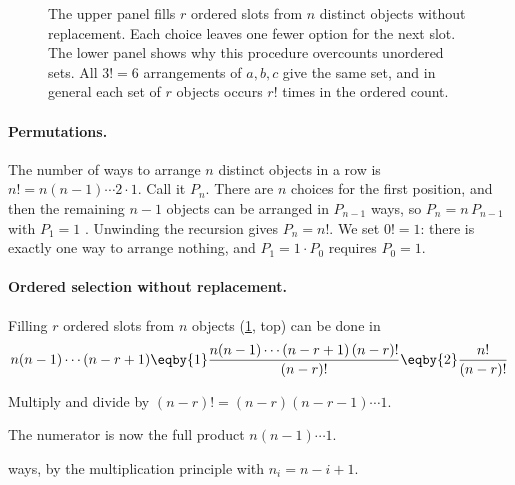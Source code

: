 \begin{figure}[htbp]
\centering
{}
\caption{The upper panel fills $r$ ordered slots from $n$ distinct objects without replacement. Each choice leaves one fewer option for the next slot. The lower panel shows why this procedure overcounts unordered sets. All $3!=6$ arrangements of $a,b,c$ give the same set, and in general each set of $r$ objects occurs $r!$ times in the ordered count.}
\label{1a:fig:slots}
\end{figure}

\paragraph{Permutations.} The number of ways to arrange $n$ distinct objects in
a row is $n!=n(n-1)\cdots2\cdot1$. Call it $P_n$. There are $n$ choices for the
first position, and then the remaining $n-1$ objects can be arranged in
$P_{n-1}$ ways, so $P_n=n\,P_{n-1}$ with $P_1=1$ .
Unwinding the recursion gives $P_n=n!$. We set $0!=1$: there is exactly one way
to arrange nothing, and $P_1=1\cdot P_0$ requires $P_0=1$.

\paragraph{Ordered selection without replacement.} Filling $r$ ordered slots
from $n$ objects (\cref{1a:fig:slots}, top) can be done in
\begin{align*}
n(n-1)\cdots(n-r+1)\eqby{1}\frac{n(n-1)\cdots(n-r+1)\,(n-r)!}{(n-r)!}\eqby{2}\frac{n!}{(n-r)!}
\end{align*}
\begin{explain}
  \item Multiply and divide by $(n-r)!=(n-r)(n-r-1)\cdots1$.
  \item The numerator is now the full product $n(n-1)\cdots1$.
\end{explain}
ways, by the multiplication principle with $n_i=n-i+1$.


